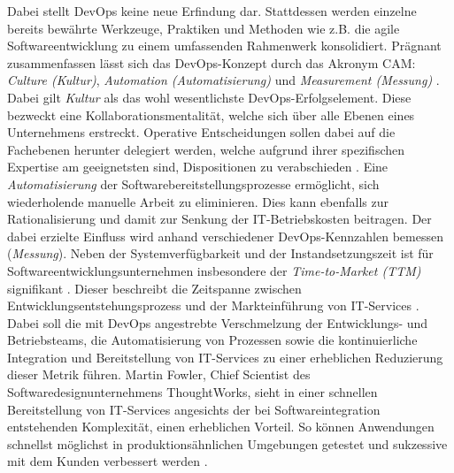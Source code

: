 Dabei stellt DevOps keine neue Erfindung dar. Stattdessen werden einzelne bereits bewährte Werkzeuge, Praktiken und Methoden wie z.B. die agile Softwareentwicklung zu einem umfassenden Rahmenwerk konsolidiert. Prägnant zusammenfassen lässt sich das DevOps-Konzept durch das Akronym CAM: \textit{Culture (Kultur)}, \textit{Automation (Automatisierung)} und \textit{Measurement (Messung)} \cite[5]{Halstenberg.2020}. Dabei gilt \textit{Kultur} als das wohl wesentlichste DevOps-Erfolgselement. Diese bezweckt eine Kollaborationsmentalität, welche sich über alle Ebenen eines Unternehmens erstreckt. Operative Entscheidungen sollen dabei auf die Fachebenen herunter delegiert werden, welche aufgrund ihrer spezifischen Expertise am geeignetsten sind, Dispositionen zu verabschieden \cite[5]{Halstenberg.2020}. Eine \textit{Automatisierung} der Softwarebereitstellungsprozesse ermöglicht, sich wiederholende manuelle Arbeit zu eliminieren. Dies kann ebenfalls zur Rationalisierung und damit zur Senkung der IT-Betriebskosten beitragen. Der dabei erzielte Einfluss wird anhand verschiedener DevOps-Kennzahlen bemessen (\textit{Messung}). Neben der Systemverfügbarkeit und der Instandsetzungszeit ist für Softwareentwicklungsunternehmen insbesondere der \textit{Time-to-Market (\acs{TTM})} signifikant \cite[7]{Halstenberg.2020}. Dieser beschreibt die Zeitspanne zwischen Entwicklungsentstehungsprozess und der Markteinführung von IT-Services \cite[141]{Vesey.1992}. Dabei soll die mit DevOps angestrebte Verschmelzung der Entwicklungs- und Betriebsteams, die Automatisierung von Prozessen sowie die kontinuierliche Integration und Bereitstellung von IT-Services zu einer erheblichen Reduzierung dieser Metrik führen. Martin Fowler, Chief Scientist des Softwaredesignunternehmens ThoughtWorks, sieht in einer schnellen Bereitstellung von IT-Services angesichts der bei Softwareintegration entstehenden Komplexität, einen erheblichen Vorteil. So können Anwendungen schnellst möglichst in produktionsähnlichen Umgebungen getestet und sukzessive mit dem Kunden verbessert werden \cite{.20230407}. 

